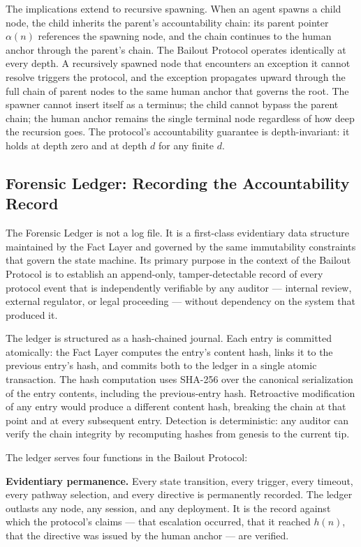 The implications extend to recursive spawning. When an agent spawns a child node, the child inherits the parent's accountability chain: its parent pointer $\alpha(n)$ references the spawning node, and the chain continues to the human anchor through the parent's chain. The Bailout Protocol operates identically at every depth. A recursively spawned node that encounters an exception it cannot resolve triggers the protocol, and the exception propagates upward through the full chain of parent nodes to the same human anchor that governs the root. The spawner cannot insert itself as a terminus; the child cannot bypass the parent chain; the human anchor remains the single terminal node regardless of how deep the recursion goes. The protocol's accountability guarantee is depth-invariant: it holds at depth zero and at depth $d$ for any finite $d$.

\subsection{Forensic Ledger: Recording the Accountability Record}
\label{sec:impl:forensic}

The Forensic Ledger is not a log file. It is a first-class evidentiary data structure maintained by the Fact Layer and governed by the same immutability constraints that govern the state machine. Its primary purpose in the context of the Bailout Protocol is to establish an append-only, tamper-detectable record of every protocol event that is independently verifiable by any auditor — internal review, external regulator, or legal proceeding — without dependency on the system that produced it.

The ledger is structured as a hash-chained journal. Each entry is committed atomically: the Fact Layer computes the entry's content hash, links it to the previous entry's hash, and commits both to the ledger in a single atomic transaction. The hash computation uses SHA-256 over the canonical serialization of the entry contents, including the previous-entry hash. Retroactive modification of any entry would produce a different content hash, breaking the chain at that point and at every subsequent entry. Detection is deterministic: any auditor can verify the chain integrity by recomputing hashes from genesis to the current tip.

The ledger serves four functions in the Bailout Protocol:

\bigskip
\noindent\textbf{Evidentiary permanence.} Every state transition, every trigger, every timeout, every pathway selection, and every directive is permanently recorded. The ledger outlasts any node, any session, and any deployment. It is the record against which the protocol's claims — that escalation occurred, that it reached $h(n)$, that the directive was issued by the human anchor — are verified.

